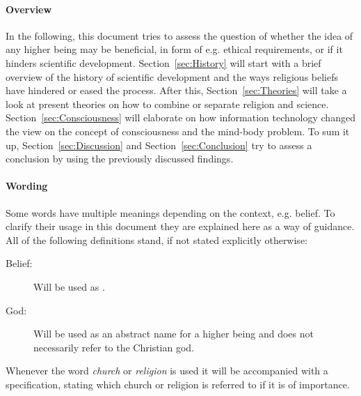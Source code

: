 \paragraph{Overview}
In the following, this document tries to assess the question of whether the idea of any higher being may be beneficial, in form of e.g. ethical requirements, or if it hinders scientific development.
Section~\ref{sec:History} will start with a brief overview of the history of scientific development and the ways religious beliefs have hindered or eased the process.
After this, Section~\ref{sec:Theories} will take a look at present theories on how to combine or separate religion and science.
Section~\ref{sec:Consciousness} will elaborate on how information technology changed the view on the concept of consciousness and the mind-body problem.
To sum it up, Section~\ref{sec:Discussion} and Section~\ref{sec:Conclusion} try to assess a conclusion by using the previously discussed findings.

\paragraph{Wording}
Some words have multiple meanings depending on the context, e.g. belief.
To clarify their usage in this document they are explained here as a way of guidance.
All of the following definitions stand, if not stated explicitly otherwise:
\begin{description}
    \item[Belief:] Will be used as .
    \item[God:] Will be used as an abstract name for a higher being and does not necessarily refer to the Christian god.
\end{description}
Whenever the word \emph{church} or \emph{religion} is used it will be accompanied with a specification, stating which church or religion is referred to if it is of importance.